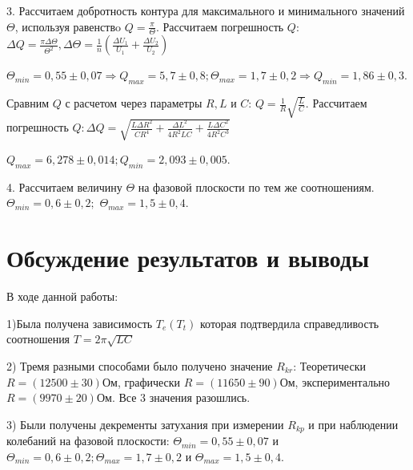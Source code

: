 \documentclass[a4paper,12pt]{article}
\begin{document}
\par 3. Рассчитаем добротность контура для максимального и минимального значений $\Theta$, используя равенствo $Q = \frac{\pi}{\Theta}$. Рассчитаем погрешность $Q$: $\Delta Q = \frac{\pi \Delta \Theta}{\Theta^2}, \Delta \Theta = \frac{1}{n}(\frac{\Delta U_1}{U_1} + \frac{\Delta U_2}{U_2}) $ 
\par $\Theta_{min} = 0,55 \pm 0,07 \Rightarrow Q_{max} = 5,7 \pm 0,8; \Theta_{max} = 1,7 \pm 0,2 \Rightarrow Q_{min} = 1,86 \pm 0,3.$ 
\par Сравним $Q$ с расчетом через параметры $R,L$ и $C$: $Q = \frac{1}{R} \sqrt{\frac{L}{C}}.$ Рассчитаем погрешность $Q: \Delta Q = \sqrt{\frac{L \Delta R^2}{C R^4} + \frac{\Delta L^2}{4 R^2LC} + \frac{L \Delta C^2}{4 R^2C^3}}$
\par $Q_{max} = 6,278 \pm 0,014; Q_{min} = 2,093 \pm 0,005.$
\par 4. Рассчитаем величину $\Theta$ на фазовой плоскости по тем же соотношениям. $\Theta_{min} = 0,6 \pm 0,2;$ $ \Theta_{max} = 1,5 \pm 0,4$.

\section{Обсуждение результатов и выводы}
\par В ходе данной работы:
\par 1)Была получена зависимость $T_e(T_t)$ которая подтвердила справедливость соотношения $T = 2 \pi \sqrt{LC}$
\par 2) Тремя разными способами было получено значение $R_{kr}$: Теоретически $R = (12500 \pm 30) Ом$, графически $R = (11650 \pm 90) Ом$, экспериментально $R = (9970 \pm 20) Ом$. Все 3 значения разошлись.
\par 3) Были получены декременты затухания при измерении $R_{kp}$ и при наблюдении колебаний на фазовой плоскости: $\Theta_{min} = 0,55 \pm 0,07$ и $\Theta_{min} = 0,6 \pm 0,2; \Theta_{max} = 1,7 \pm 0,2$ и $\Theta_{max} = 1,5 \pm 0,4$.
\end{document}
